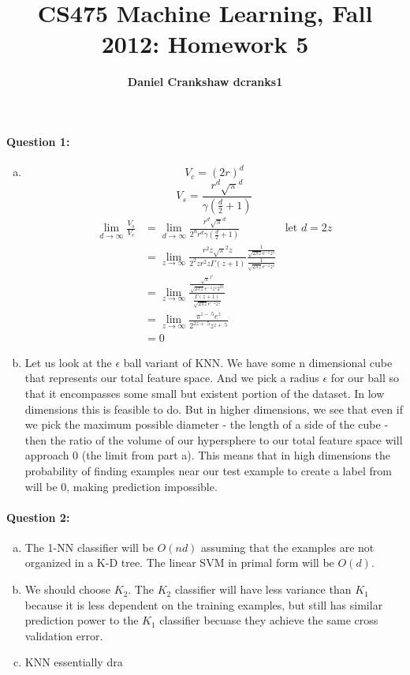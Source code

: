 \documentclass[letterpaper,11pt]{article}
\title{CS475 Machine Learning, Fall 2012: Homework 5}
\date{}
\author{\bf Daniel Crankshaw dcranks1}
\begin{document}
\maketitle

\paragraph{Question 1:}
\begin{enumerate}[(a)]
\item
\begin{equation}
V_c = (2r)^d
\end{equation}
\begin{equation}
V_s = \frac{r^d \sqrt{\pi}^d}{\gamma (\frac{d}{2} + 1)}
\end{equation}
\begin{align}
\lim_{d \rightarrow \infty} \frac{V_s}{V_c} 
& = \lim_{d \rightarrow \infty} \frac{r^d \sqrt{\pi}^d}{2^d r^d \gamma (\frac{d}{2} + 1)} & \text{let $d = 2z$}\\
& = \lim_{z \rightarrow \infty} \frac{r^2z \sqrt{\pi}^2z}{2^2z r^2z \Gamma (z + 1)} \frac{\frac{1}{\sqrt{2 \pi z} e^{-z} z^z}}{\frac{1}{\sqrt{2 \pi z} e^{-z} z^z}}\\
& = \lim_{z \rightarrow \infty} \frac{\frac{\sqrt{\pi}^{2^z}}{\sqrt{2 \pi z}e^{-z} z^z 2^{2z}}}{\frac{\Gamma (z + 1)}{\sqrt{2 \pi z}e^{-z} z^z}}\\
& = \lim_{z \rightarrow \infty} \frac{\pi^{z -.5} e^z}{2^{2z +.5}{z^{z +.5}}}\\
& = 0
\end{align}
\item
    Let us look at the $\epsilon$ ball variant of KNN\@. We have some
    n dimensional cube that represents our total feature space. And we pick
    a radius $\epsilon$ for our ball so that it encompasses some small but existent
    portion of the dataset. In low dimensions this is feasible to do. But in higher
    dimensions, we see that even if we pick the maximum possible diameter - the length
    of a side of the cube - then the ratio of the volume of our hypersphere to our total
    feature space will approach 0 (the limit from part a). This means that in high dimensions
    the probability of finding examples near our test example to create a label from will
    be 0, making prediction impossible.
\end{enumerate}

\paragraph{Question 2:}
\begin{enumerate}[(a)]
\item The 1-NN classifier will be $O(n d)$ assuming that the examples are not organized in
    a K-D tree. The linear SVM in primal form will be $O(d)$.
\item
    We should choose $K_2$. The $K_2$ classifier will have less variance than
    $K_1$ because it is less dependent on the training examples, but still has
    similar prediction power to the $K_1$ classifier becuase they achieve the
    same cross validation error.
\item
    KNN essentially dra
\end{enumerate}
\end{document}

